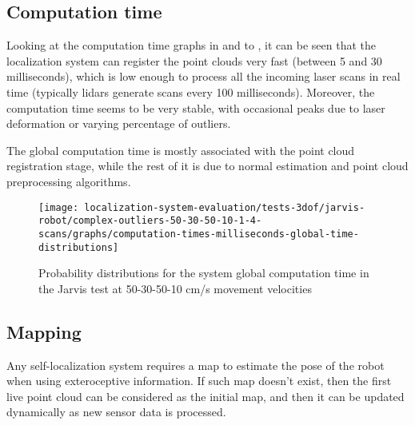 \subsection{Computation time}

Looking at the computation time graphs in  and to , it can be seen that the localization system can register the point clouds very fast (between 5 and 30 milliseconds), which is low enough to process all the incoming laser scans in real time (typically \glspl{lidar} generate scans every 100 milliseconds). Moreover, the computation time seems to be very stable, with occasional peaks due to laser deformation or varying percentage of outliers.

The global computation time is mostly associated with the point cloud registration stage, while the rest of it is due to normal estimation and point cloud preprocessing algorithms.

\begin{figure}[H]
	\centering
	\texttt{[image: localization-system-evaluation/tests-3dof/jarvis-robot/complex-outliers-50-30-50-10-1-4-scans/graphs/computation-times-milliseconds-global-time-distributions]}
	\caption{Probability distributions for the  system global computation time in the Jarvis test at 50-30-50-10 cm/s movement velocities}
	\label{fig:localization-system-evaluation_complex-path-with-outliers-50-30-50-10cm-per-sec-velocity-1-4-scans-computation-time}
\end{figure}


\subsection{Mapping}

Any self-localization system requires a map to estimate the pose of the robot when using exteroceptive information. If such map doesn't exist, then the first live point cloud can be considered as the initial map, and then it can be updated dynamically as new sensor data is processed.

